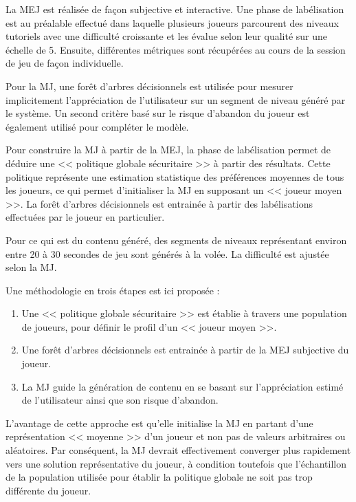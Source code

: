 \documentclass[a4paper,11pt]{article}
\begin{document}
        La MEJ est réalisée de façon subjective et interactive.
        Une phase de labélisation est au préalable effectué dans laquelle plusieurs joueurs parcourent des niveaux tutoriels avec une difficulté croissante et les évalue selon leur qualité sur une échelle de 5.
        Ensuite, différentes métriques sont récupérées au cours de la session de jeu de façon individuelle.

        Pour la MJ, une forêt d'arbres décisionnels est utilisée pour mesurer implicitement l'appréciation de l'utilisateur sur un segment de niveau généré par le système.
        Un second critère basé sur le risque d'abandon du joueur est également utilisé pour compléter le modèle.
        
        Pour construire la MJ à partir de la MEJ, la phase de labélisation permet de déduire une << politique globale sécuritaire >> à partir des résultats.
        Cette politique représente une estimation statistique des préférences moyennes de tous les joueurs, ce qui permet d'initialiser la MJ en supposant un << joueur moyen >>.
        La forêt d'arbres décisionnels est entrainée à partir des labélisations effectuées par le joueur en particulier.
        
        Pour ce qui est du contenu généré, des segments de niveaux représentant environ entre 20 à 30 secondes de jeu sont générés à la volée.
        La difficulté est ajustée selon la MJ. 
        
        Une méthodologie en trois étapes est ici proposée : 
        \begin{enumerate}
          \item Une << politique globale sécuritaire >> est établie à travers une population de joueurs, pour définir le profil d'un << joueur moyen >>.  
          \item Une forêt d'arbres décisionnels est entrainée à partir de la MEJ subjective du joueur.
          \item La MJ guide la génération de contenu en se basant sur l'appréciation estimé de l'utilisateur ainsi que son risque d'abandon.
        \end{enumerate}
        L'avantage de cette approche est qu'elle initialise la MJ en partant d'une représentation << moyenne >> d'un joueur et non pas de valeurs arbitraires ou aléatoires.
        Par conséquent, la MJ devrait effectivement converger plus rapidement vers une solution représentative du joueur, à condition toutefois que l'échantillon de la population utilisée pour établir la politique globale ne soit pas trop différente du joueur. 
\end{document}
